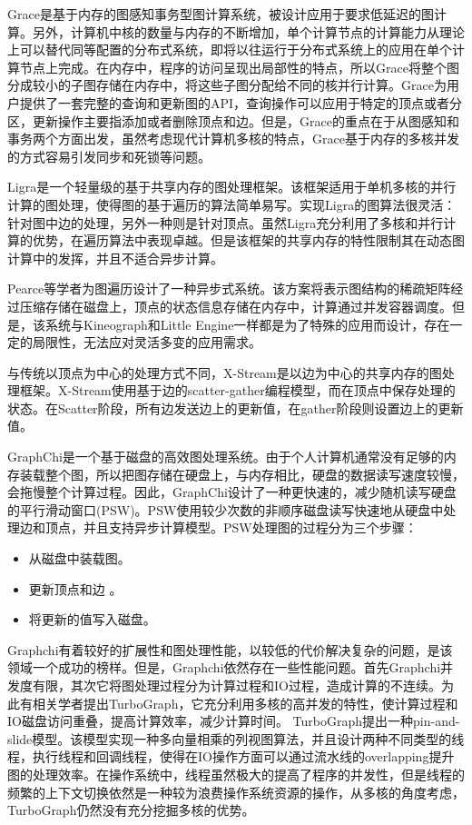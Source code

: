 Grace\cite{prabhakaran2012managing}是基于内存的图感知事务型图计算系统，被设计应用于要求低延迟的图计算。另外，计算机中核的数量与内存的不断增加，单个计算节点的计算能力从理论上可以替代同等配置的分布式系统，即将以往运行于分布式系统上的应用在单个计算节点上完成。在内存中，程序的访问呈现出局部性的特点，所以Grace将整个图分成较小的子图存储在内存中，将这些子图分配给不同的核并行计算。Grace为用户提供了一套完整的查询和更新图的API，查询操作可以应用于特定的顶点或者分区，更新操作主要指添加或者删除顶点和边。但是，Grace的重点在于从图感知和事务两个方面出发，虽然考虑现代计算机多核的特点，Grace基于内存的多核并发的方式容易引发同步和死锁等问题。

Ligra\cite{shun2013ligra}是一个轻量级的基于共享内存的图处理框架。该框架适用于单机多核的并行计算的图处理，使得图的基于遍历的算法简单易写。实现Ligra的图算法很灵活：针对图中边的处理，另外一种则是针对顶点。虽然Ligra充分利用了多核和并行计算的优势，在遍历算法中表现卓越。但是该框架的共享内存的特性限制其在动态图计算中的发挥，并且不适合异步计算。

Pearce\cite{pearce2010multithreaded}等学者为图遍历设计了一种异步式系统。该方案将表示图结构的稀疏矩阵经过压缩存储在磁盘上，顶点的状态信息存储在内存中，计算通过并发容器调度。但是，该系统与Kineograph和Little Engine一样都是为了特殊的应用而设计，存在一定的局限性，无法应对灵活多变的应用需求。

与传统以顶点为中心的处理方式不同，X-Stream\cite{roy2013x}是以边为中心的共享内存的图处理框架。X-Stream\cite{roy2013x}使用基于边的scatter-gather编程模型，而在顶点中保存处理的状态。在Scatter阶段，所有边发送边上的更新值，在gather阶段则设置边上的更新值。

GraphChi\cite{kyrola2012graphchi}是一个基于磁盘的高效图处理系统。由于个人计算机通常没有足够的内存装载整个图，所以把图存储在硬盘上，与内存相比，硬盘的数据读写速度较慢，会拖慢整个计算过程。因此，GraphChi设计了一种更快速的，减少随机读写硬盘的平行滑动窗口(PSW)。PSW使用较少次数的非顺序磁盘读写快速地从硬盘中处理边和顶点，并且支持异步计算模型。PSW处理图的过程分为三个步骤：
\begin{itemize}
\item 从磁盘中装载图。
\item 更新顶点和边 。
\item 将更新的值写入磁盘。
\end{itemize}
Graphchi有着较好的扩展性和图处理性能，以较低的代价解决复杂的问题，是该领域一个成功的榜样。但是，Graphchi依然存在一些性能问题。首先Graphchi并发度有限，其次它将图处理过程分为计算过程和IO过程，造成计算的不连续。为此有相关学者提出TurboGraph，它充分利用多核的高并发的特性，使计算过程和IO磁盘访问重叠，提高计算效率，减少计算时间。
TurboGraph\cite{han2013turbograph}提出一种pin-and-slide模型。该模型实现一种多向量相乘的列视图算法，并且设计两种不同类型的线程，执行线程和回调线程，使得在IO操作方面可以通过流水线的overlapping提升图的处理效率。在操作系统中，线程虽然极大的提高了程序的并发性，但是线程的频繁的上下文切换依然是一种较为浪费操作系统资源的操作，从多核的角度考虑，TurboGraph仍然没有充分挖掘多核的优势。

